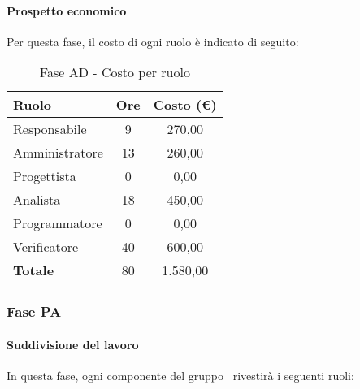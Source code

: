 \documentclass[../PianoProgetto.tex]{subfiles}
\begin{document}
	\paragraph{Prospetto economico}
					Per questa fase, il costo di ogni ruolo è indicato di seguito:
					\begin{table}[h]
		\centering
	
		\begin{tabular}{l * {2}{c}}
			\toprule
			\textbf{Ruolo} & \textbf{Ore} & \textbf{Costo (\euro{})} \\
			\midrule
			Responsabile &	9 & 270,00 \\
			Amministratore & 13 & 260,00 \\
			Progettista & 0 & 0,00 \\
			Analista & 18 & 450,00 \\
			Programmatore & 0 & 0,00 \\
			Verificatore & 40 & 600,00 \\
			\midrule		
			\textbf{Totale} & 80 & 1.580,00 \\
			\bottomrule
			
		\end{tabular}
		
		\caption{Fase AD - Costo per ruolo}
		\label{tab:faseAD_costo}
		
	\end{table}
\newpage	
	\subsubsection{Fase PA}
				\paragraph{Suddivisione del lavoro}
					In questa fase, ogni componente del gruppo \leaf\ rivestirà i seguenti ruoli:
	
\end{document}
